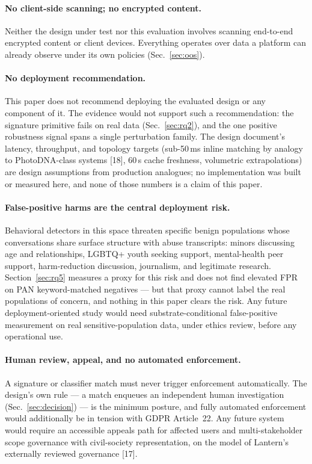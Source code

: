 \documentclass[11pt]{article}
\begin{document}
\paragraph{No client-side scanning; no encrypted content.}
Neither the design under test nor this evaluation involves scanning end-to-end encrypted content or client devices. Everything operates over data a platform can already observe under its own policies (Sec.~\ref{sec:oos}).

\paragraph{No deployment recommendation.}
This paper does not recommend deploying the evaluated design or any component of it. The evidence would not support such a recommendation: the signature primitive fails on real data (Sec.~\ref{sec:rq2}), and the one positive robustness signal spans a single perturbation family. The design document's latency, throughput, and topology targets (sub-50\,ms inline matching by analogy to PhotoDNA-class systems [18], 60\,s cache freshness, volumetric extrapolations) are design assumptions from production analogues; no implementation was built or measured here, and none of those numbers is a claim of this paper.

\paragraph{False-positive harms are the central deployment risk.}
Behavioral detectors in this space threaten specific benign populations whose conversations share surface structure with abuse transcripts: minors discussing age and relationships, LGBTQ+ youth seeking support, mental-health peer support, harm-reduction discussion, journalism, and legitimate research. Section~\ref{sec:rq5} measures a proxy for this risk and does not find elevated FPR on PAN keyword-matched negatives --- but that proxy cannot label the real populations of concern, and nothing in this paper clears the risk. Any future deployment-oriented study would need substrate-conditional false-positive measurement on real sensitive-population data, under ethics review, before any operational use.

\paragraph{Human review, appeal, and no automated enforcement.}
A signature or classifier match must never trigger enforcement automatically. The design's own rule --- a match enqueues an independent human investigation (Sec.~\ref{sec:decision}) --- is the minimum posture, and fully automated enforcement would additionally be in tension with GDPR Article~22. Any future system would require an accessible appeals path for affected users and multi-stakeholder scope governance with civil-society representation, on the model of Lantern's externally reviewed governance [17].
\end{document}
